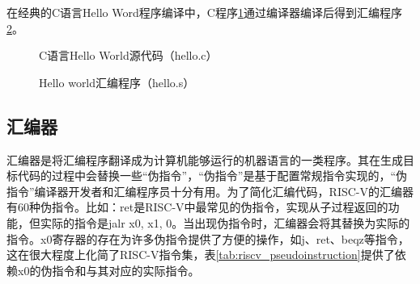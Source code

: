 在经典的C语言Hello Word程序编译中，C程序\ref{fig:hello_c_example}通过编译器编译后得到汇编程序\ref{fig:hello_s_example}。

\begin{figure}[htbp]
	\centering
	
	\caption{C语言Hello World源代码（hello.c）}
	\label{fig:hello_c_example}
\end{figure}

\begin{figure}[htbp]
	\centering
	
	\caption{Hello world汇编程序（hello.s）}
	\label{fig:hello_s_example}
\end{figure}

\subsection{汇编器}
汇编器是将汇编程序翻译成为计算机能够运行的机器语言的一类程序。其在生成目标代码的过程中会替换一些``伪指令''，``伪指令''是基于配置常规指令实现的，``伪指令''编译器开发者和汇编程序员十分有用。为了简化汇编代码，RISC-V的汇编器有60种伪指令。比如：ret是RISC-V中最常见的伪指令，实现从子过程返回的功能，但实际的指令是jalr x0, x1, 0。当出现伪指令时，汇编器会将其替换为实际的指令。x0寄存器的存在为许多伪指令提供了方便的操作，如j、ret、beqz等指令，这在很大程度上化简了RISC-V指令集，表\ref{tab:riscv_pseudoinstruction}提供了依赖x0的伪指令和与其对应的实际指令。

